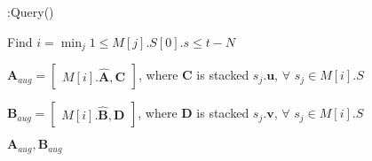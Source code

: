 \begin{algorithm}[t]
    \caption{\newsolution:Query()}
    \label{alg:query}
    \DontPrintSemicolon

    Find $i = \min_j 1\leq M[j].S[0].s\leq t - N$
    
    $\boldsymbol{A}_{aug} = 
    \begin{bmatrix}
     M[i].\hat{\boldsymbol{A}},\boldsymbol{C}   
    \end{bmatrix}$, where $\boldsymbol{C}$ is stacked $s_j.\boldsymbol{u}$, $\forall$ $s_j \in M[i].S$
    
    $\boldsymbol{B}_{aug} = 
    \begin{bmatrix}
     M[i].\hat{\boldsymbol{B}}, \boldsymbol{D}   
    \end{bmatrix}$, where $\boldsymbol{D}$ is stacked $s_j.\boldsymbol{v}$, $\forall$ $s_j \in M[i].S$

    \Return $\boldsymbol{A}_{aug}, \boldsymbol{B}_{aug}$
    
\end{algorithm}